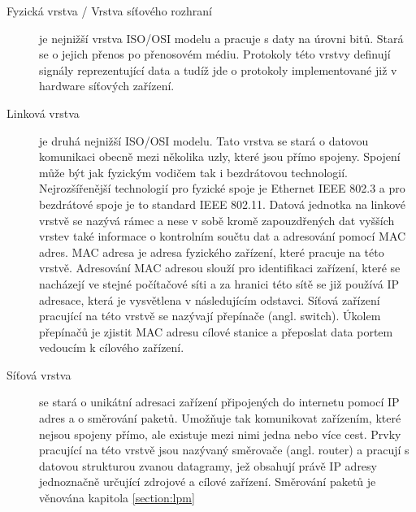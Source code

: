 \begin{description}
\item[Fyzická vrstva / Vrstva síťového rozhraní]\label{layers:physical} %
je nejnižší vrstva ISO/OSI modelu a pracuje s daty na úrovni bitů. Stará se o
jejich přenos po přenosovém médiu. Protokoly této vrstvy definují signály reprezentující data
a tudíž jde o protokoly implementované již v hardware síťových zařízení.

\item[Linková vrstva]\label{layers:link} %
je druhá nejnižší ISO/OSI modelu. Tato vrstva se stará o datovou komunikaci
obecně mezi několika uzly, které jsou přímo spojeny. Spojení může být jak fyzickým vodičem tak i
bezdrátovou technologií. Nejrozšířenější technologií pro fyzické spoje je Ethernet IEEE 802.3 a pro bezdrátové spoje
je to standard IEEE 802.11. Datová jednotka na linkové vrstvě se nazývá rámec a nese v sobě kromě
zapouzdřených dat vyšších vrstev také informace o kontrolním součtu dat a adresování pomocí MAC adres.
MAC adresa je adresa fyzického zařízení, které pracuje na této vrstvě.
Adresování MAC adresou slouží pro identifikaci zařízení, které se nacházejí ve stejné počítačové síti
a za hranici této sítě se již používá IP adresace, která je vysvětlena v následujícím odstavci.
Síťová zařízení pracující na této vrstvě se nazývají přepínače (angl. switch). Úkolem přepínačů je zjistit MAC adresu cílové stanice a přeposlat data portem vedoucím k cílového zařízení.

\item[Síťová vrstva]\label{layers:network} %
se stará o unikátní adresaci zařízení připojených do internetu pomocí IP adres a o směrování paketů.
Umožňuje tak komunikovat zařízením, které nejsou spojeny přímo, ale existuje mezi nimi jedna nebo více cest.
Prvky pracující na této vrstvě jsou nazývaný směrovače (angl. router) a pracují s datovou strukturou zvanou
datagramy, jež obsahují právě IP adresy jednoznačně určující zdrojové a cílové zařízení. Směrování paketů
je věnována kapitola \ref{section:lpm}


\end{description}
